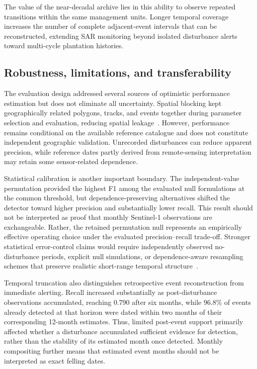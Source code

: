 The value of the near-decadal archive lies in this ability to observe repeated transitions within the same management units. Longer temporal coverage increases the number of complete adjacent-event intervals that can be reconstructed, extending SAR monitoring beyond isolated disturbance alerts toward multi-cycle plantation histories.


\subsection{Robustness, limitations, and transferability}

The evaluation design addressed several sources of optimistic performance estimation but does not eliminate all uncertainty. Spatial blocking kept geographically related polygons, tracks, and events together during parameter selection and evaluation, reducing spatial leakage~\citep{Roberts2017SpatialCV}. However, performance remains conditional on the available reference catalogue and does not constitute independent geographic validation. Unrecorded disturbances can reduce apparent precision, while reference dates partly derived from remote-sensing interpretation may retain some sensor-related dependence.

Statistical calibration is another important boundary. The independent-value permutation provided the highest F1 among the evaluated null formulations at the common threshold, but dependence-preserving alternatives shifted the detector toward higher precision and substantially lower recall. This result should not be interpreted as proof that monthly Sentinel-1 observations are exchangeable. Rather, the retained permutation null represents an empirically effective operating choice under the evaluated precision--recall trade-off. Stronger statistical error-control claims would require independently observed no-disturbance periods, explicit null simulations, or dependence-aware resampling schemes that preserve realistic short-range temporal structure~\citep{Kunsch1989BlockBootstrap}.

Temporal truncation also distinguishes retrospective event reconstruction from immediate alerting. Recall increased substantially as post-disturbance observations accumulated, reaching 0.790 after six months, while 96.8\% of events already detected at that horizon were dated within two months of their corresponding 12-month estimates. Thus, limited post-event support primarily affected whether a disturbance accumulated sufficient evidence for detection, rather than the stability of its estimated month once detected. Monthly compositing further means that estimated event months should not be interpreted as exact felling dates.

